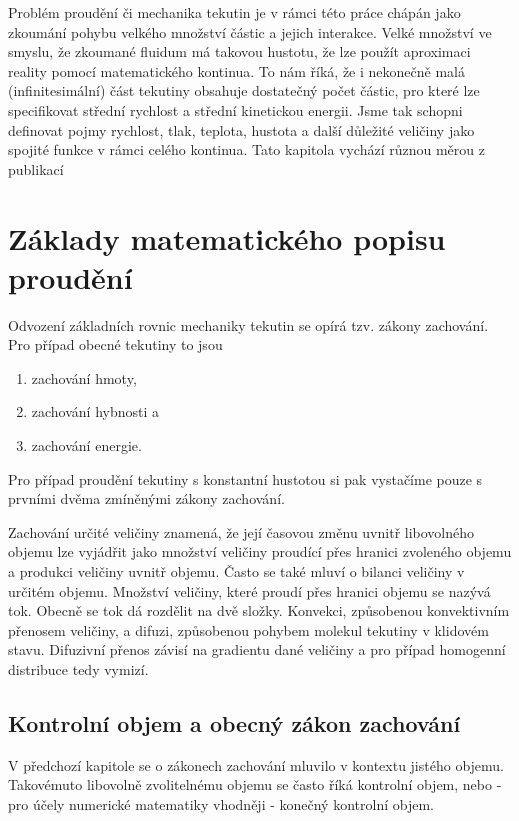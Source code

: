 
Problém proudění či mechanika tekutin je v rámci této práce chápán jako zkoumání pohybu velkého množství částic a jejich interakce. Velké množství ve smyslu, že zkoumané fluidum má takovou hustotu, že lze použít aproximaci reality pomocí matematického kontinua. To nám říká, že i nekonečně malá (infinitesimální) část tekutiny obsahuje dostatečný počet částic, pro které lze specifikovat střední rychlost a střední kinetickou energii. Jsme tak schopni definovat pojmy rychlost, tlak, teplota, hustota a další důležité veličiny jako spojité funkce v rámci celého kontinua. Tato kapitola vychází různou měrou z publikací \cite{blazek2015computational, dvorak1987vnitrniaerodynamika, hirsch2007numerical, shapiro1953dynamics, furst2020mko2}

\section{Základy matematického popisu proudění} \label{sec:zaklady_popisu}

Odvození základních rovnic mechaniky tekutin se opírá tzv. zákony zachování. Pro případ obecné tekutiny to jsou
\begin{enumerate}
	\item zachování hmoty,
	\item zachování hybnosti a
	\item zachování energie.
\end{enumerate}
Pro případ proudění tekutiny s konstantní hustotou si pak vystačíme pouze s prvními dvěma zmíněnými zákony zachování.

Zachování určité veličiny znamená, že její časovou změnu uvnitř libovolného objemu lze vyjádřit jako množství veličiny proudící přes hranici zvoleného objemu a produkci veličiny uvnitř objemu. Často se také mluví o bilanci veličiny v určitém objemu. Množství veličiny, které proudí přes hranici objemu se nazývá tok. Obecně se tok dá rozdělit na dvě složky. Konvekci, způsobenou konvektivním přenosem veličiny, a difuzi, způsobenou pohybem molekul tekutiny v klidovém stavu. Difuzivní přenos závisí na gradientu dané veličiny a pro případ homogenní distribuce tedy vymizí.

\subsection{Kontrolní objem a obecný zákon zachování}\label{sec:kontrolni_objem}
V předchozí kapitole se o zákonech zachování mluvilo v kontextu jistého objemu. Takovémuto libovolně zvolitelnému objemu se často říká kontrolní objem, nebo - pro účely numerické matematiky vhodněji - konečný kontrolní objem.

